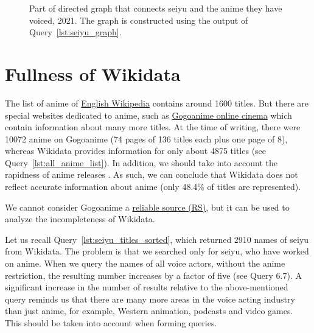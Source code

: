 \begin{figure*}

    \setlength{\fboxsep}{0pt}%
    \setlength{\fboxrule}{1pt}%
	\caption[Part of directed graph that connects seiyu to anime they have voiced, 2021.]{Part of directed graph that connects seiyu and the anime they have voiced, 2021. The graph is constructed using the output of Query~\ref{lst:seiyu_graph}.}%
    \label{fig:Seiyu_graph_en}%
\end{figure*} 

\section{Fullness of Wikidata}

The list of anime of \href{https://w.wiki/4Xs4}{English Wikipedia} contains around \num{1600} titles. But there are special websites dedicated to anime, such as \href{https://www1.gogoanime.cm/}{Gogoanime online cinema}%
which contain information about many more titles. At the time of writing, there were \num{10072} anime on Gogoanime (\num{74} pages of \num{136} titles each plus one page of \num{8}), whereas Wikidata provides information for only about \num{4875} titles (see Query~\ref{lst:all_anime_list}). In addition, we should take into account the rapidness of anime releases%
%
. As such, we can conclude that Wikidata does not reflect accurate information about anime (only \num{48.4}\% of titles are represented).

We cannot consider Gogoanime a \href{https://w.wiki/Eiw}{reliable source (RS)}, but it can be used to analyze the incompleteness of Wikidata.

Let us recall Query~\protect\ref{lst:seiyu_titles_sorted}, which returned \num{2910} names of seiyu from Wikidata. The problem is that we searched only for seiyu, who have worked on anime. When we query the names of all voice actors, without the anime restriction, the resulting number increases by a factor of five (see Query 6.7). A significant increase in the number of results relative to the above-mentioned query reminds us that there are many more areas in the voice acting industry than just anime, for example, Western animation, podcasts and video games. This should be taken into account when forming queries.

